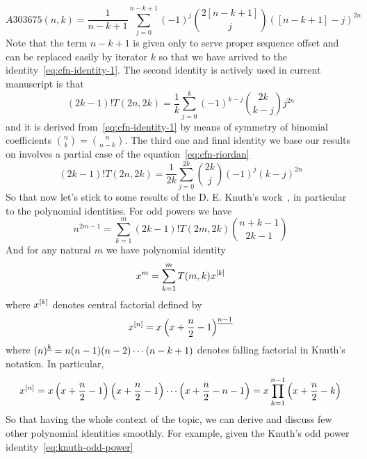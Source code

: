 \begin{equation*}
    A303675(n,k) = \frac{1}{n-k+1} \sum_{j=0}^{n-k+1} (-1)^{j} \binom{2[n-k+1]}{j} ([n-k+1]-j)^{2n}
\end{equation*}
Note that the term $n-k+1$ is given only to serve proper sequence offset and can be replaced easily by iterator $k$
so that we have arrived to the identity~\eqref{eq:cfn-identity-1}.
The second identity is actively used in current manuscript is that
\begin{equation}
(2k-1)
    !T(2n,2k) = \frac{1}{k} \sum_{j=0}^{k} (-1)^{k-j} \binom{2k}{k-j} j^{2n}\label{eq:cfn-identity-2}
\end{equation}
and it is derived from~\eqref{eq:cfn-identity-1} by means
of symmetry of binomial coefficients $\binom{n}{k} = \binom{n}{n-k}$.
The third one and final identity we base our results on involves a partial case of the equation~\eqref{eq:cfn-riordan}
\begin{equation}
(2k-1)
    !T(2n, 2k) = \frac{1}{2k} \sum_{j=0}^{2k} \binom{2k}{j} (-1)^{j} (k-j)^{2n}\label{eq:cfn-identity-3}
\end{equation}
So that now let's stick to some results of the D. E. Knuth's work~\cite{knuth1993johann},
in particular to the polynomial identities.
For odd powers we have
\begin{equation}
    n^{2m-1} = \sum_{k=1}^{m} (2k-1)! T(2m,2k) \binom{n+k-1}{2k-1}\label{eq:knuth-odd-power}
\end{equation}
And for any natural $m$ we have polynomial identity
\begin{equation}
    x^m = \sum_{k=1}^{m} T(m, k) x^{[k]}\label{eq:knuth-power-identity}
\end{equation}
where $x^{[k]}$ denotes central factorial defined by
\begin{equation*}
    x^{[n]} = x \left(x+\frac{n}{2}-1 \right)^{\underline{n-1}}
\end{equation*}
where $\left(n \right)^{\underline{k}} = n (n-1) (n-2) \cdots (n-k+1)$ denotes falling factorial in Knuth's notation.
In particular,
\begin{equation*}
    x^{[n]}
    = x \left( x+\frac{n}{2}-1 \right) \left( x+\frac{n}{2}-1 \right) \cdots \left (x+\frac{n}{2}-n-1 \right)
    = x \prod_{k=1}^{n-1} \left( x+\frac{n}{2}-k \right)
\end{equation*}
So that having the whole context of the topic, we can derive and discuss few other polynomial identities smoothly.
For example, given the Knuth's odd power identity~\eqref{eq:knuth-odd-power}
